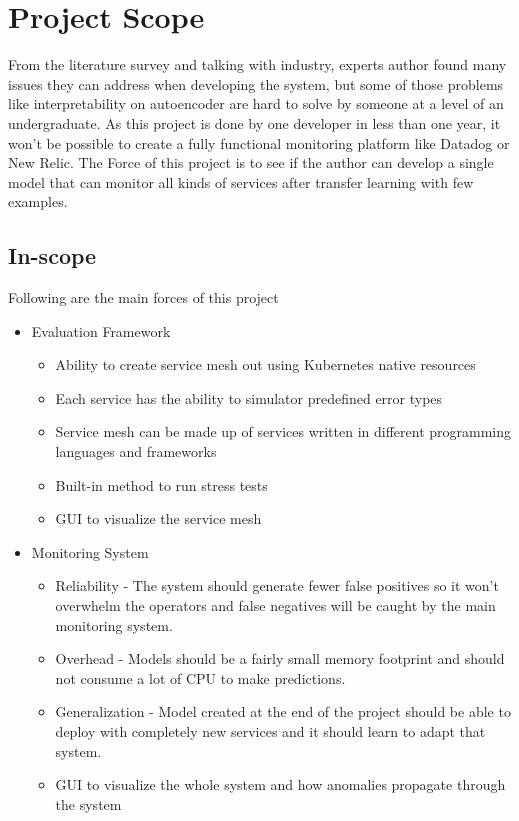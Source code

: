 {\let\clearpage\relax\chapter{Project Scope}}

From the literature survey and talking with industry, experts author found many issues they can address when developing the system, but some of those problems like interpretability on autoencoder \citep{ribeiro2016should} are hard to solve by someone at a level of an undergraduate. As this project is done by one developer in less than one year, it won't be possible to create a fully functional monitoring platform like Datadog or New Relic. The Force of this project is to see if the author can develop a single model that can monitor all kinds of services after transfer learning with few examples. 

\section{In-scope} \label{sec:in-scope}
Following are the main forces of this project
\begin{itemize}
    \item Evaluation Framework
    \begin{itemize}
        \item Ability to create service mesh out using Kubernetes native resources
        \item Each service has the ability to simulator predefined error types
        \item Service mesh can be made up of services written in different programming languages and  frameworks 
        \item Built-in method to run stress tests
        \item GUI to visualize the service mesh
    \end{itemize}
    \item Monitoring System
    \begin{itemize}
        \item Reliability - The system should generate fewer false positives so it won't overwhelm the operators and false negatives will be caught by the main monitoring system.
        \item Overhead - Models should be a fairly small memory footprint and should not consume a lot of CPU to make predictions.
        \item Generalization - Model created at the end of the project should be able to deploy with completely new services and it should learn to adapt that system.
        \item GUI to visualize the whole system and how anomalies propagate through the system
    \end{itemize}
\end{itemize}


